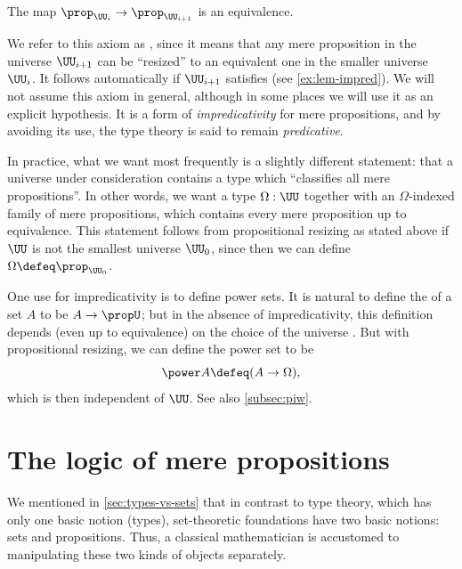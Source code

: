 \begin{axiom}
  The map $\prop_{\UU_i} \to \prop_{\UU_{i+1}}$ is an equivalence.
\end{axiom}

We refer to this axiom as ,
since it means that any mere proposition in the universe $\UU_{i+1}$ can be ``resized'' to an equivalent one in the smaller universe $\UU_i$.
It follows automatically if $\UU_{i+1}$ satisfies \LEM{} (see \cref{ex:lem-impred}).
We will not assume this axiom in general, although in some places we will use it as an explicit hypothesis.
It is a form of \emph{impredicativity} for mere propositions, and by avoiding its use, the type theory is said to remain \emph{predicative}.
%
%

In practice, what we want most frequently is a slightly different statement: that a universe \UU under consideration contains a type which ``classifies all mere propositions''.
In other words, we want a type $\Omega:\UU$ together with an $\Omega$-indexed family of mere propositions, which contains every mere proposition up to equivalence.
This statement follows from propositional resizing as stated above if $\UU$ is not the smallest universe $\UU_0$, since then we can define $\Omega\defeq \prop_{\UU_0}$.

One use for impredicativity is to define power sets.
It is natural to define the  of a set $A$ to be $A\to\propU$; but in the absence of impredicativity, this definition depends
(even up to equivalence) on the choice of the universe \UU.
But with propositional resizing, we can define the power set to be
%
\[ \power A \defeq (A\to\Omega),\]
which is then independent of $\UU$.
See also \cref{subsec:piw}.


\section{The logic of mere propositions}
\label{subsec:logic-hprop}

%
We mentioned in \cref{sec:types-vs-sets} that in contrast to type theory, which has only one basic notion (types), set-theoretic foundations have two basic notions: sets and propositions.
Thus, a classical mathematician is accustomed to manipulating these two kinds of objects separately.


